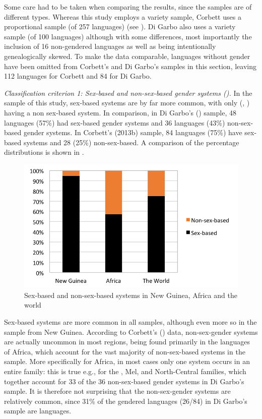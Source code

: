 \documentclass[output=collectionpaper]{langsci/langscibook}
\begin{document}
Some care had to be taken when comparing the results, since the samples are of different types. Whereas this study employs a variety sample, Corbett uses a proportional sample (of 257 languages) (see ). Di Garbo also uses a variety sample (of 100 languages) although with some differences, most importantly the inclusion of 16 non-gendered languages as well as being intentionally genealogically skewed. To make the data comparable, languages without gender have been omitted from Corbett's and Di Garbo's samples in this section, leaving 112 languages for Corbett and 84 for Di Garbo.



\textit{Classification criterion 1: Sex-based and non-sex-based gender systems ().} In the sample of this study, sex-based systems are by far more common, with only  (, ) having a non sex-based system. In comparison, in Di Garbo's (\citealt*[63]{DiGarbo2014}) sample, 48 languages (57\%) had sex-based gender systems and 36 languages (43\%) non-sex-based gender systems. In Corbett's (2013b) sample, 84 languages (75\%) have sex-based systems and 28 (25\%) non-sex-based. A comparison of the percentage distributions is shown in .


\begin{figure}
\includegraphics[width=\textwidth]{figures/09/fig7.png}
\caption{Sex-based and non-sex-based systems in New Guinea, Africa and the world}
\label{fig:Svard:7}
\end{figure}


Sex-based systems are more common in all samples, although even more so in the sample from New Guinea. According to Corbett's (\citealt*{Corbett2013a}) data, non-sex-gender systems are actually uncommon in most regions, being found primarily in the  languages of Africa, which account for the vast majority of non-sex-based systems in the sample. More specifically for Africa, in most cases only one system occurs in an entire family: this is true e.g., for the , Mel, and North-Central  families, which together account for 33 of the 36 non-sex-based gender systems in Di Garbo's sample. It is therefore not surprising that the non-sex-gender systems are relatively common, since 31\% of the gendered languages (26/84) in Di Garbo's sample are  languages.
\end{document}
